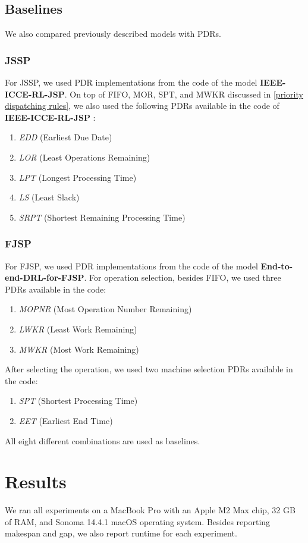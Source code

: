 \subsection{Baselines}
We also compared previously described models with PDRs.
\par
\subsubsection*{JSSP}
For JSSP, we used PDR implementations from the code of the model \textbf{IEEE-ICCE-RL-JSP}. On top of FIFO, MOR, SPT, and MWKR discussed in \ref{priority dispatching rules}, we also used the following PDRs available in the code of \textbf{IEEE-ICCE-RL-JSP} \cite{github_ieee_icce_rl_jsp}:
\begin{enumerate}
    \item \textit{EDD} (Earliest Due Date)
    \item \textit{LOR} (Least Operations Remaining)
    \item \textit{LPT} (Longest Processing Time)
    \item \textit{LS} (Least Slack)
    \item \textit{SRPT} (Shortest Remaining Processing Time)
\end{enumerate}

\subsubsection*{FJSP}
For FJSP, we used PDR implementations from the code of the model \textbf{End-to-end-DRL-for-FJSP}. For operation selection, besides FIFO, we used three PDRs available in the code:
\begin{enumerate}
    \item \textit{MOPNR} (Most Operation Number Remaining)
    \item \textit{LWKR} (Least Work Remaining)
    \item \textit{MWKR} (Most Work Remaining)
\end{enumerate}
After selecting the operation, we used two machine selection PDRs available in the code:
\begin{enumerate}
    \item \textit{SPT} (Shortest Processing Time)
    \item \textit{EET} (Earliest End Time)
\end{enumerate}
All eight different combinations are used as baselines.

\section{Results}
We ran all experiments on a MacBook Pro with an Apple M2 Max chip, 32 GB of RAM, and Sonoma 14.4.1 macOS operating system. Besides reporting makespan and gap, we also report runtime for each experiment. 


